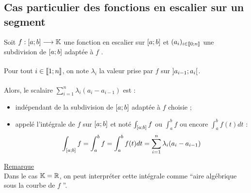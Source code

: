 \subsection{Cas particulier des fonctions en escalier sur un segment}
\begin{defprop}
    Soit \(f : \left[a;b\right] \longrightarrow \mathbb{K}\) une fonction en escalier sur \(\left[a;b\right]\) et \((a_i)_{i\in \left\llbracket0;n\right\rrbracket}\) une subdivision de \(\left[a;b\right]\) adaptée à \(f\) .\\~\\
    Pour tout \(i \in  \left\llbracket1;n\right\rrbracket\), on note \(\lambda_i\) la valeur prise par \(f\) sur \(\left]a_{i-1};a_i\right[\).\\~\\
    Alors, le scalaire \(\sum^n_{i=1}\lambda_i (a_i -  a_{i- 1})\) est :
    \begin{itemize}
        \item indépendant de la subdivision de \(\left[a;b\right]\) adaptée à \(f\) choisie ;
        \item appelé l’intégrale de \(f\) sur \(\left[a;b\right]\) et noté \(\int_{\left[a;b\right]} f\) ou \(\int^b_a f\) ou encore \(\int^b_a f (t)dt\) :
        \[\int_{\left[a;b\right]} f =\int^b_a f =\int^b_a f (t)dt = \sum^n_{i=1} \lambda_i (a_i -  a_{i- 1})\]
    \end{itemize}
    \underline{Remarque}\\
    Dans le cas \(\mathbb{K} = \mathbb{R}\), on peut interpréter cette intégrale comme “aire algébrique sous la courbe de \(f\) ”.
\end{defprop}
